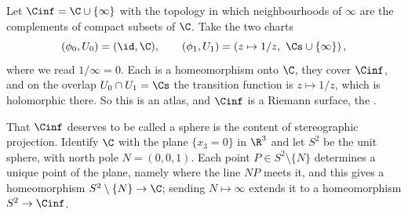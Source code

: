 \begin{example}\label{ex:sphere}
	Let $\Cinf = \C \cup \{\infty\}$ with the topology in which neighbourhoods of $\infty$
	are the complements of compact subsets of $\C$. Take the two charts
	$$
	(\phi_0, U_0) = (\id, \C), \qquad (\phi_1, U_1) = \left(z \mapsto 1/z, \ \Cs \cup \{\infty\}\right),
	$$
	where we read $1/\infty = 0$. Each is a homeomorphism onto $\C$, they cover $\Cinf$,
	and on the overlap $U_0 \cap U_1 = \Cs$ the transition function is $z \mapsto 1/z$,
	which is holomorphic there. So this is an atlas, and $\Cinf$ is a Riemann surface,
	the .
\end{example}

That $\Cinf$ deserves to be called a sphere is the content of stereographic projection.
Identify $\C$ with the plane $\{x_3 = 0\}$ in $\R^3$ and let $S^2$ be the unit sphere,
with north pole $N = (0,0,1)$. Each point $P \in S^2 \setminus \{N\}$ determines a unique
point of the plane, namely where the line $NP$ meets it, and this gives a homeomorphism
$S^2 \setminus \{N\} \to \C$; sending $N \mapsto \infty$ extends it to a homeomorphism
$S^2 \to \Cinf$.

\begin{center}
\end{center}

